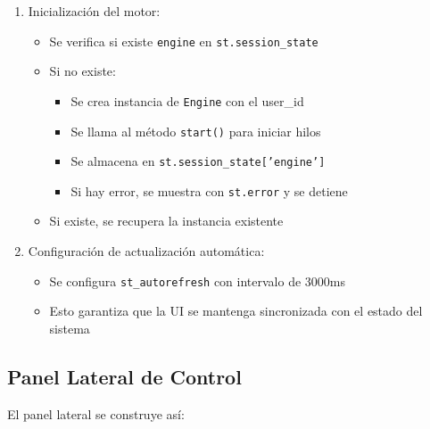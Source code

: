 \documentclass[12pt]{article}
\begin{document}
\begin{enumerate}
    \item Inicialización del motor:
    \begin{itemize}
        \item Se verifica si existe \texttt{engine} en \texttt{st.session\_state}
        \item Si no existe:
        \begin{itemize}
            \item Se crea instancia de \texttt{Engine} con el user\_id
            \item Se llama al método \texttt{start()} para iniciar hilos
            \item Se almacena en \texttt{st.session\_state['engine']}
            \item Si hay error, se muestra con \texttt{st.error} y se detiene
        \end{itemize}
        \item Si existe, se recupera la instancia existente
    \end{itemize}

    \item Configuración de actualización automática:
    \begin{itemize}
        \item Se configura \texttt{st\_autorefresh} con intervalo de 3000ms
        \item Esto garantiza que la UI se mantenga sincronizada con el estado del sistema
    \end{itemize}
\end{enumerate}

\subsection{Panel Lateral de Control}
El panel lateral se construye así:
\end{document}
